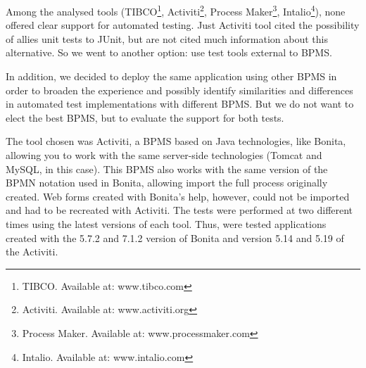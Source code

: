\documentclass[runningheads,a4paper]{llncs}
\begin{document}
Among the analysed tools (TIBCO\footnote{TIBCO. Available at: www.tibco.com}, Activiti\footnote{Activiti. Available at: www.activiti.org}, Process Maker\footnote{Process Maker. Available at: www.processmaker.com}, Intalio\footnote{Intalio. Available at: www.intalio.com}), none offered clear support for automated testing. Just Activiti tool cited the possibility of allies unit tests to JUnit, but are not cited much information about this alternative. So we went to another option: use test tools external to BPMS.

In addition, we decided to deploy the same application using other BPMS in order to broaden the experience and possibly identify similarities and differences in automated test implementations with different BPMS. But we do not want to elect the best BPMS, but to evaluate the support for both tests.

The tool chosen was Activiti, a BPMS based on Java technologies, like Bonita, allowing you to work with the same server-side technologies (Tomcat and MySQL, in this case). This BPMS also works with the same version of the BPMN notation used in Bonita, allowing import the full process originally created. Web forms created with Bonita's help, however, could not be imported and had to be recreated with Activiti. The tests were performed at two different times using the latest versions of each tool. Thus, were tested applications created with the 5.7.2 and 7.1.2 version of Bonita and version  5.14 and 5.19 of the Activiti. 
\end{document}
